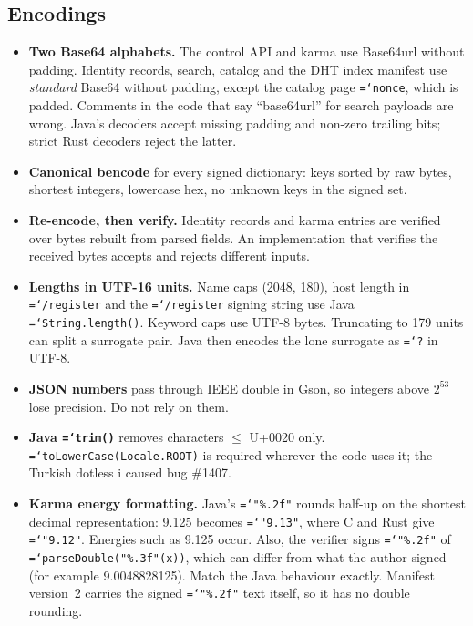 \documentclass[11pt,a4paper]{article}
\newcommand{\code}[1]{\texttt{\hyphenchar\font=`\-\relax #1}}
\DeclareRobustCommand{\_}{\origunderscore\allowbreak}
\begin{document}
\subsection{Encodings}
\begin{itemize}
\item \textbf{Two Base64 alphabets.} The control API and karma use Base64url without padding.
  Identity records, search, catalog and the DHT index manifest use \emph{standard} Base64
  without padding, except the catalog page \code{nonce}, which is padded. Comments in the code
  that say ``base64url'' for search payloads are wrong. Java's decoders accept missing
  padding and non-zero trailing bits; strict Rust decoders reject the latter.
\item \textbf{Canonical bencode} for every signed dictionary: keys sorted by raw bytes,
  shortest integers, lowercase hex, no unknown keys in the signed set.
\item \textbf{Re-encode, then verify.} Identity records and karma entries are verified over
  bytes rebuilt from parsed fields. An implementation that verifies the received bytes accepts
  and rejects different inputs.
\item \textbf{Lengths in UTF-16 units.} Name caps (2048, 180), host length in
  \code{/register} and the \code{/register} signing string use Java \code{String.length()}.
  Keyword caps use UTF-8 bytes. Truncating to 179 units can split a surrogate pair. Java then
  encodes the lone surrogate as \code{?} in UTF-8.
\item \textbf{JSON numbers} pass through IEEE double in Gson, so integers above $2^{53}$ lose
  precision. Do not rely on them.
\item \textbf{Java \code{trim()}} removes characters $\le$ U+0020 only.
  \code{toLowerCase(Locale.ROOT)} is required wherever the code uses it; the Turkish dotless
  i caused bug \#1407.
\item \textbf{Karma energy formatting.} Java's \code{"\%.2f"} rounds half-up on the shortest
  decimal representation: 9.125 becomes \code{"9.13"}, where C and Rust give
  \code{"9.12"}. Energies such as 9.125 occur. Also, the verifier signs
  \code{"\%.2f"} of \code{parseDouble("\%.3f"(x))}, which can differ from what the author
  signed (for example 9.0048828125). Match the Java behaviour exactly. Manifest version~2
  carries the signed \code{"\%.2f"} text itself, so it has no double rounding.
\end{itemize}
\end{document}
